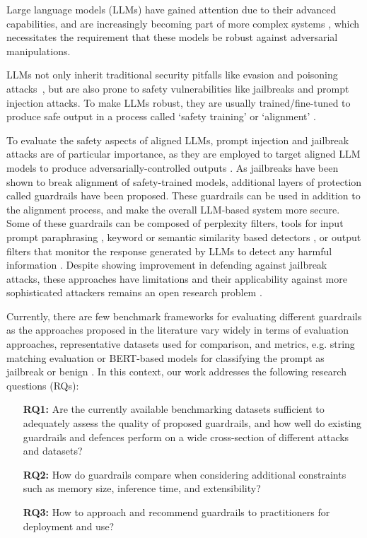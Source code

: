 Large language models (LLMs) have gained attention due to their advanced capabilities, and are increasingly becoming part of more complex systems \cite{yuan2022wordcraft, nakano2021webgpt, zhu2023multilingual}, which necessitates the requirement that these models be robust against adversarial manipulations.

LLMs not only inherit traditional security pitfalls like evasion and poisoning attacks~\cite{carlini2017towards, munoz2017towards}, but are also prone to safety vulnerabilities like jailbreaks and prompt injection attacks.
To make LLMs robust, they are usually trained/fine-tuned to produce safe output in a process called  `safety training' or `alignment' \cite{carlini2024aligned}.

To evaluate the safety aspects of aligned LLMs, prompt injection and jailbreak attacks are of particular importance, as they are employed to target aligned LLM models to produce adversarially-controlled outputs \cite{shayegani2023survey, zou2023universal, zhu2023autodan, wei2024jailbroken}.
As jailbreaks have been shown to break alignment of safety-trained models, additional layers of protection called guardrails have been proposed. These guardrails can be used in addition to the alignment process, and make the overall LLM-based system more secure.
Some of these guardrails can be composed of perplexity filters, tools for input prompt paraphrasing \cite{jain2023baseline}, keyword or semantic similarity based detectors \cite{LangKit}, or  output filters that monitor the response generated by LLMs to detect any harmful information \cite{helbling2023llm}. Despite showing improvement in defending against jailbreak attacks, these approaches have limitations and their applicability against more sophisticated attackers remains an open research problem \cite{shayegani2023survey, anwar2024foundational}. 

Currently, there are few benchmark frameworks for evaluating different guardrails as the approaches proposed in the literature vary widely in terms of evaluation approaches, representative datasets used for comparison, and metrics, e.g. string matching evaluation or BERT-based models for classifying the prompt as jailbreak or benign \cite{anwar2024foundational}. 
In this context, our work addresses the following research questions (RQs):

\begin{itemize}[noitemsep]
\label{research_questions}
    \item[\textbf{RQ1:}]  Are the currently available benchmarking datasets sufficient to adequately assess the quality of proposed guardrails, and how well do existing guardrails and defences perform on a wide cross-section of different attacks and datasets?
    \item[\textbf{RQ2:}] How do guardrails compare when considering additional constraints such as memory size, inference time, and extensibility?
    \item[\textbf{RQ3:}] How to approach and recommend guardrails to practitioners for deployment and use? 
\end{itemize}

